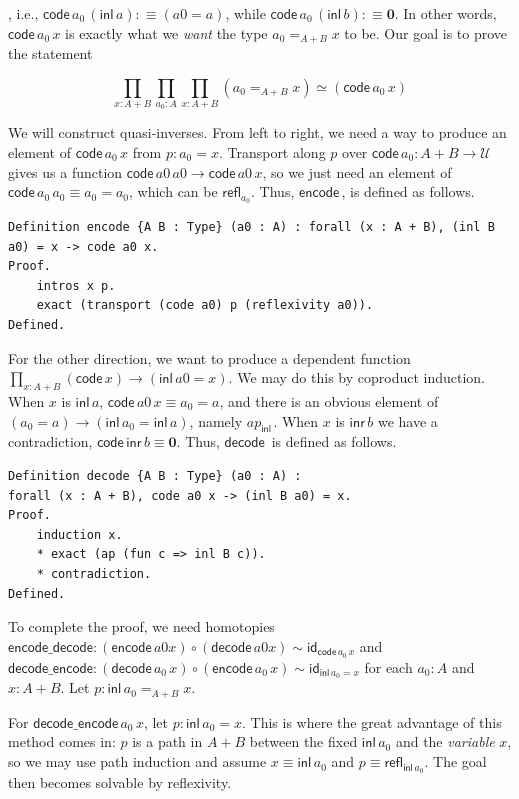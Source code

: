 \documentclass[12 pt]{amsart}
\theoremstyle{definition}
\theoremstyle{remark}
\newcommand{\inl}{\mathsf{inl}\,}
\newcommand{\inr}{\mathsf{inr}\,}
\newcommand{\Type}{\mathcal{U}}
\newcommand{\refl}{\mathsf{refl}}
\newcommand{\zero}{{\mathbf{0}}}
\newcommand{\id}{{\mathsf{id}}}
\newcommand{\code}{{\mathsf{ code}\,}}
\newcommand{\encode}{{\mathsf{ encode}\,}}
\newcommand{\decode}{{\mathsf{ decode}\,}}
\newcommand{\encodedecode}{\mathsf{encode\_decode}}
\newcommand{\decodeencode}{\mathsf{decode\_encode}}
\begin{document}
, i.e., $\code a_0\, (\inl a) :\equiv (a0 = a)$, while $\code a_0\, (\inl b) :\equiv \zero$. In other words, $\code a_0\, x$ is exactly what we \textit{want} the type $a_0 =_{A + B} x$ to be. Our goal is to prove the statement

\begin{equation}
\prod_{x : A + B} \prod_{a_0 : A} \prod_{x : A + B} (a_0 =_{A + B} x) \simeq (\code a_0 \, x)
\label{eq_coprod}
\end{equation} 

We will construct quasi-inverses. From left to right, we need a way to produce an element of $\code a_0 \, x$ from $p : a_0 = x$. Transport along $p$ over $\code a_0 : A + B \to \Type$ gives us a function $\code a0 \,a0 \to \code a0\, x$, so we just need an element of $\code a_0 \,a_0 \equiv a_0 = a_0$, which can be $\refl_{a_0}$. Thus, $\encode$, is defined as follows.

\begin{lstlisting}
Definition encode {A B : Type} (a0 : A) : forall (x : A + B), (inl B a0) = x -> code a0 x.
Proof.
    intros x p.
    exact (transport (code a0) p (reflexivity a0)).
Defined.
\end{lstlisting}

For the other direction, we want to produce a dependent function $\prod_{x : A + B} (\code x) \to (\inl a0 = x)$. We may do this by coproduct induction. When $x$ is $\inl a$, $\code a0\, x \equiv a_0 = a$, and there is an obvious element of $(a_0 = a) \to (\inl a_0 = \inl a)$, namely $ap_{\inl}$. When $x$ is $\inr b$ we have a contradiction, $\code \inr b \equiv \zero$. Thus, $\decode$ is defined as follows.

\begin{lstlisting}
Definition decode {A B : Type} (a0 : A) : 
forall (x : A + B), code a0 x -> (inl B a0) = x.
Proof.
    induction x.
    * exact (ap (fun c => inl B c)).
    * contradiction.
Defined.
\end{lstlisting}

To complete the proof, we need homotopies $\encodedecode : (\encode a0 x) \circ (\decode a0 x) \sim \id_{\code a_0 \, x}$ and $\decodeencode :     (\decode a_0\, x) \circ (\encode a_0\, x) \sim \id_{\inl a_0 = x}$ for each $a_0 : A$ and $x : A + B$. Let $p : \inl a_0 =_{A + B} x$. 

For $\decodeencode\, a_0\, x $, let $p : \inl a_0 = x $. This is where the great advantage of this method comes in: $p$ is a path in $A+B$ between the fixed $\inl a_0$ and the \textit{variable} $x$, so we may use path induction and assume $x \equiv \inl a_0$ and $p \equiv \refl_{\inl a_0}$. The goal then becomes solvable by reflexivity.
\end{document}
